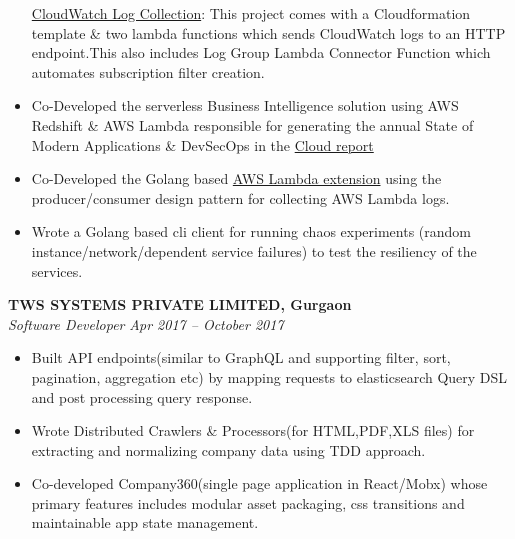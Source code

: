 \documentclass[margin,line]{resume}
\begin{document}
\begin{resume}
\begin{itemize}
            \subitem \href{https://help.sumologic.com/Send-Data/Collect-from-Other-Data-Sources/Amazon-CloudWatch-Logs}{CloudWatch Log Collection}: This project comes with a Cloudformation template \& two lambda functions which sends CloudWatch logs to an HTTP endpoint.This also includes Log Group Lambda Connector Function which automates subscription filter creation.
            \item Co-Developed the serverless Business Intelligence solution  using AWS Redshift \& AWS Lambda responsible for generating the annual State of Modern Applications \& DevSecOps in the \href{https://www.sumologic.com/brief/state-modern-apps-report/}{Cloud report}
            \item Co-Developed the Golang based \href{https://github.com/SumoLogic/sumologic-lambda-extensions}{AWS Lambda extension} using the producer/consumer design pattern for collecting AWS Lambda logs.
            \item Wrote a Golang based cli client for running chaos experiments (random instance/network/dependent service failures) to test the resiliency of the services.
            
            
        \end{itemize}
    \newpage
    \textbf{TWS SYSTEMS PRIVATE LIMITED, Gurgaon}\\
           \textsl{Software Developer} \hfill \textsl{Apr 2017 -- October 2017} \vspace{1mm}%
    \begin{itemize}

            \item Built API endpoints(similar to GraphQL and supporting filter, sort, pagination, aggregation etc) by mapping requests to elasticsearch Query DSL and post processing query response.
            \item Wrote Distributed Crawlers \& Processors(for HTML,PDF,XLS files) for extracting and normalizing company data using TDD approach.
           \item Co-developed Company360(single page application in React/Mobx) whose primary features includes modular asset packaging, css transitions and maintainable app state management.
        \end{itemize}


\end{resume}
\end{document}
